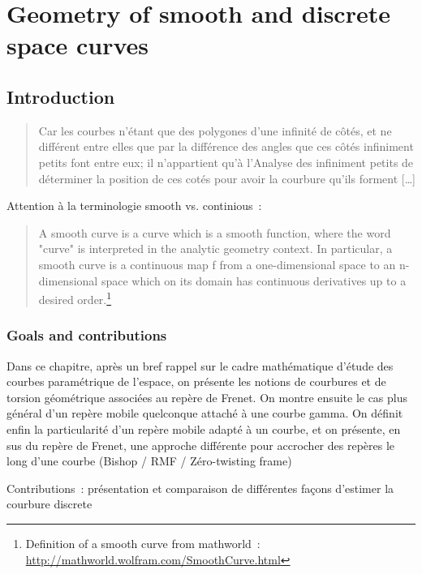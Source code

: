 \chapter{Geometry of smooth and discrete space curves}
\section{Introduction}


\blockcquote[Liebniz]{}{Car les courbes n’étant que des polygones d’une infinité de côtés, et ne différent
entre elles que par la différence des angles que ces côtés infiniment petits font
entre eux; il n’appartient qu’à l’Analyse des infiniment petits de déterminer la
position de ces cotés pour avoir la courbure qu’ils forment [\dots]}.

Attention à la terminologie smooth vs. continious~:

\blockquote{A smooth curve is a curve which is a smooth function,  where the word "curve" is interpreted in the analytic geometry context. In particular, a smooth curve is a continuous map f from a one-dimensional space to an n-dimensional space which on its domain has continuous derivatives up to a desired order.\footnote{Definition of a smooth curve from mathworld~: \url{http://mathworld.wolfram.com/SmoothCurve.html}}
} 

\subsection{Goals and contributions}
Dans ce chapitre, après un bref rappel sur le cadre mathématique d'étude des courbes paramétrique de l'espace, on présente les notions de courbures et de torsion géométrique associées au repère de Frenet. On montre ensuite le cas plus général d'un repère mobile quelconque attaché à une courbe gamma. On définit enfin la particularité d'un repère mobile adapté à un courbe, et on présente, en sus du repère de Frenet, une approche différente pour accrocher des repères le long d'une courbe (Bishop / RMF / Zéro-twisting frame)

Contributions~: présentation et comparaison de différentes façons d'estimer la courbure discrete

